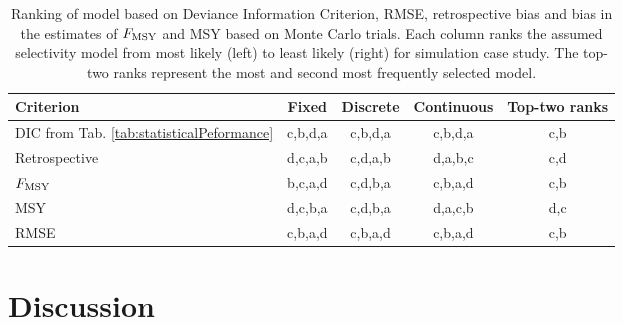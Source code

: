 \documentclass[review,letterpaper,10pt,authoryear]{elsarticle}
\begin{document}
\begin{table*}[!tbh]
	\caption{Ranking of model based on Deviance Information Criterion, RMSE, retrospective bias and bias in the estimates of $F_{\rm{MSY}}$ and MSY based on Monte Carlo trials. Each column ranks the assumed selectivity model from most likely (left) to least likely (right) for simulation case study.  The top-two ranks represent the most and second most frequently selected model.}
	\label{tab:rankorder}
	\begin{center}
		\begin{tabular}{l|ccc|c}
		\hline

		\hline
		\textbf{Criterion} & \textbf{Fixed} & \textbf{Discrete} &\textbf{Continuous} & \textbf{Top-two ranks} \\
		\hline
		DIC from Tab. \ref{tab:statisticalPeformance}
		           & c,b,d,a & c,b,d,a & c,b,d,a & c,b\\
		\hline
		Retrospective    & d,c,a,b & c,d,a,b & d,a,b,c & c,d\\
		$F_{\rm{MSY}}$   & b,c,a,d & c,d,b,a & c,b,a,d & c,b\\
		MSY              & d,c,b,a & c,d,b,a & d,a,c,b & d,c\\
		RMSE             & c,b,a,d & c,b,a,d & c,b,a,d & c,b\\
		\hline

		\hline
		\end{tabular}
	\end{center}
\end{table*}








	\section*{Discussion} %
\label{sec:discussion}
\end{document}

